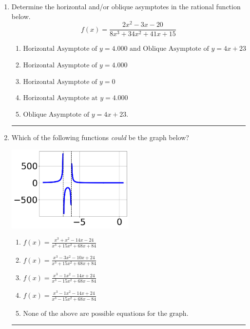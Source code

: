 \documentclass[14pt]{extbook}
\newcommand{\litem}[1]{\item#1\hspace*{-1cm}\rule{\textwidth}{0.4pt}}
\begin{document}
\begin{enumerate}
{\begin{enumerate}[label=\Alph*.]
\end{enumerate} }
\litem{
Determine the horizontal and/or oblique asymptotes in the rational function below.\[ f(x) = \frac{2x^{2} -3 x -20}{8x^{3} +34 x^{2} +41 x + 15} \]\begin{enumerate}[label=\Alph*.]
\item \( \text{Horizontal Asymptote of } y = 4.000 \text{ and Oblique Asymptote of } y = 4x + 23 \)
\item \( \text{Horizontal Asymptote of } y = 4.000  \)
\item \( \text{Horizontal Asymptote of } y = 0 \)
\item \( \text{Horizontal Asymptote at } y = 4.000 \)
\item \( \text{Oblique Asymptote of } y = 4x + 23. \)

\end{enumerate} }
\litem{
Which of the following functions \textit{could} be the graph below?
\begin{center}
    \includegraphics[width=0.5\textwidth]{../Figures/identifyGraphOfRationalFunctionCopyC.png}
\end{center}
\begin{enumerate}[label=\Alph*.]
\item \( f(x)=\frac{x^{3} + x^{2} -14 x -24}{x^{3} +15 x^{2} +68 x + 84} \)
\item \( f(x)=\frac{x^{3} -3 x^{2} -10 x + 24}{x^{3} +15 x^{2} +68 x + 84} \)
\item \( f(x)=\frac{x^{3} -1 x^{2} -14 x + 24}{x^{3} -15 x^{2} +68 x -84} \)
\item \( f(x)=\frac{x^{3} -1 x^{2} -14 x + 24}{x^{3} -15 x^{2} +68 x -84} \)
\item \( \text{None of the above are possible equations for the graph.} \)


\end{enumerate}}
\end{enumerate}
\end{document}

